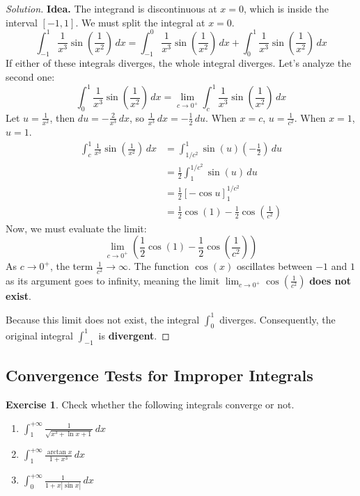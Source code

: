 \documentclass[11pt]{article}
\theoremstyle{definition}
\newtheorem{exercise}{Exercise}[section]
\newenvironment{solution}{\begin{proof}[Solution]}{\end{proof}}
\begin{document}
\begin{solution}
\textbf{Idea.} The integrand is discontinuous at $x=0$, which is inside the interval $[-1, 1]$. We must split the integral at $x=0$.
\[
\int_{-1}^1\frac{1}{x^3}\sin\left(\frac{1}{x^2}\right)\,dx = \int_{-1}^0\frac{1}{x^3}\sin\left(\frac{1}{x^2}\right)\,dx + \int_{0}^1\frac{1}{x^3}\sin\left(\frac{1}{x^2}\right)\,dx
\]
If either of these integrals diverges, the whole integral diverges. Let's analyze the second one:
\[
\int_0^1\frac{1}{x^3}\sin\left(\frac{1}{x^2}\right)\,dx = \lim_{c \to 0^+} \int_c^1 \frac{1}{x^3}\sin\left(\frac{1}{x^2}\right)\,dx
\]
Let $u = \frac{1}{x^2}$, then $du = -\frac{2}{x^3}\,dx$, so $\frac{1}{x^3}\,dx = -\frac{1}{2}\,du$.
When $x = c$, $u = \frac{1}{c^2}$. When $x = 1$, $u = 1$.
\begin{align*}
\int_c^1 \frac{1}{x^3}\sin\left(\frac{1}{x^2}\right)\,dx &= \int_{1/c^2}^1 \sin(u) \left(-\frac{1}{2}\right) \,du \\
&= \frac{1}{2} \int_1^{1/c^2} \sin(u) \,du \\
&= \frac{1}{2} \left[ -\cos u \right]_1^{1/c^2} \\
&= \frac{1}{2} \cos(1) - \frac{1}{2} \cos\left(\frac{1}{c^2}\right)
\end{align*}
Now, we must evaluate the limit:
\[
\lim_{c \to 0^+} \left( \frac{1}{2} \cos(1) - \frac{1}{2} \cos\left(\frac{1}{c^2}\right) \right)
\]
As $c \to 0^+$, the term $\frac{1}{c^2} \to \infty$. The function $\cos(x)$ oscillates between $-1$ and $1$ as its argument goes to infinity, meaning the limit $\lim_{c \to 0^+} \cos\left(\frac{1}{c^2}\right)$ \textbf{does not exist}.

Because this limit does not exist, the integral $\int_0^1$ diverges. Consequently, the original integral $\int_{-1}^1$ is \textbf{divergent}.
\end{solution}

\subsection{Convergence Tests for Improper Integrals}

\begin{exercise}
Check whether the following integrals converge or not.
\begin{enumerate}
	\item $\displaystyle \int_1^{+\infty} \frac{1}{\sqrt{x^3+\ln x+1}} \,dx$
	\item $\displaystyle \int_{1}^{+\infty} \frac{\arctan x}{1+x^3}\,dx$
	\item $\displaystyle \int_0^{+\infty}\frac{1}{1+x\left|\sin x\right|}\,dx$
\end{enumerate}
\end{exercise}
\end{document}
